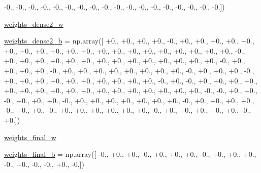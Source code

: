 \begin{DoxyCompactItemize}
-\/0., -\/0., -\/0., -\/0., -\/0., -\/0., -\/0., -\/0., -\/0., -\/0., -\/0., -\/0., -\/0., -\/0., -\/0., -\/0., -\/0., -\/0.\mbox{]})
\item 
\hyperlink{namespacepybullet-gym_1_1pybulletgym_1_1tests_1_1roboschool_1_1agents_1_1_humanoid_flagrun_harder_py_bullet_env__v0__2017may_a81bf2e455cfbe637489d5d880b4297b5}{weights\+\_\+dense2\+\_\+w}
\item 
\hyperlink{namespacepybullet-gym_1_1pybulletgym_1_1tests_1_1roboschool_1_1agents_1_1_humanoid_flagrun_harder_py_bullet_env__v0__2017may_a9b94ffe01544738a696c977dab99b1d5}{weights\+\_\+dense2\+\_\+b} = np.\+array(\mbox{[} +0., +0., +0., +0., -\/0., +0., +0., +0., +0., +0., +0., +0., +0., +0., +0., +0., +0., +0., +0., +0., +0., +0., +0., +0., +0., -\/0., +0., +0., +0., +0., +0., +0., +0., +0., +0., +0., +0., +0., +0., +0., -\/0., +0., +0., +0., +0., -\/0., +0., +0., +0., +0., +0., +0., +0., +0., -\/0., +0., +0., +0., -\/0., +0., +0., +0., +0., +0., +0., +0., +0., +0., +0., -\/0., +0., -\/0., +0., +0., +0., +0., +0., +0., +0., +0., +0., +0., +0., +0., +0., +0., +0., +0., +0., -\/0., -\/0., +0., +0., -\/0., +0., +0., +0., -\/0., +0., +0., +0., +0., +0., +0., +0., -\/0., +0., +0., +0., +0., -\/0., +0., +0., -\/0., +0., +0., +0., +0., +0., +0., -\/0., +0., +0., +0., +0., +0., -\/0., +0.\mbox{]})
\item 
\hyperlink{namespacepybullet-gym_1_1pybulletgym_1_1tests_1_1roboschool_1_1agents_1_1_humanoid_flagrun_harder_py_bullet_env__v0__2017may_a1cc97c6e322e90102f52980eb9697f0e}{weights\+\_\+final\+\_\+w}
\item 
\hyperlink{namespacepybullet-gym_1_1pybulletgym_1_1tests_1_1roboschool_1_1agents_1_1_humanoid_flagrun_harder_py_bullet_env__v0__2017may_ac6f8427fbe5637e0ffe67065aaf7c992}{weights\+\_\+final\+\_\+b} = np.\+array(\mbox{[} -\/0., +0., +0., -\/0., +0., +0., +0., -\/0., +0., +0., +0., -\/0., +0., -\/0., -\/0., +0., -\/0.\mbox{]})
\end{DoxyCompactItemize}


